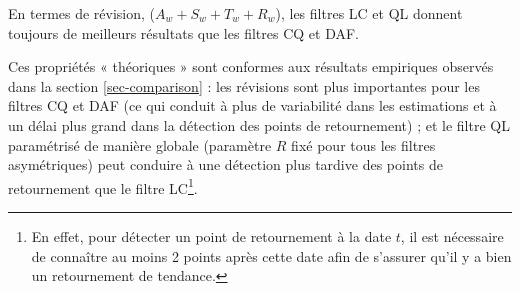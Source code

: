\documentclass[
  12pt,
  a4paper,french]{article}
\newcommand\1{\mathds{1}}
\begin{document}
En termes de révision, (\(A_w+S_w+T_w+R_w\)), les filtres LC et QL donnent toujours de meilleurs résultats que les filtres CQ et DAF.

Ces propriétés « théoriques » sont conformes aux résultats empiriques observés dans la section \ref{sec-comparison} : les révisions sont plus importantes pour les filtres CQ et DAF (ce qui conduit à plus de variabilité dans les estimations et à un délai plus grand dans la détection des points de retournement) ; et le filtre QL paramétrisé de manière globale (paramètre \(R\) fixé pour tous les filtres asymétriques) peut conduire à une détection plus tardive des points de retournement que le filtre LC\footnote{
  En effet, pour détecter un point de retournement à la date \(t\), il est nécessaire de connaître au moins 2 points après cette date afin de s'assurer qu'il y a bien un retournement de tendance.}.
\end{document}
